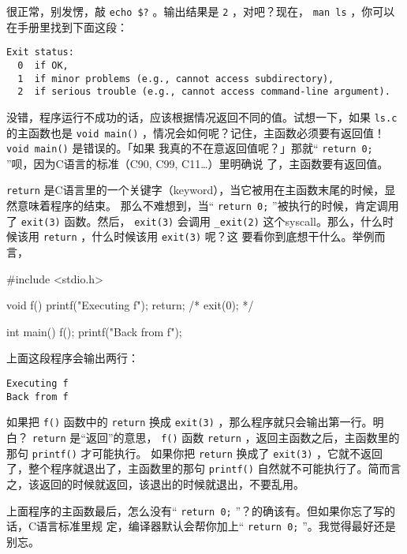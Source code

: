 \documentclass{wx672ctexart}
\begin{document}
很正常，别发愣，敲 \texttt{echo \$?} 。输出结果是 \texttt{2} ，对吧？现在， \texttt{man ls} ，你可以在手册里找到下面这段：
\begin{verbatim}
Exit status:
  0  if OK,
  1  if minor problems (e.g., cannot access subdirectory),
  2  if serious trouble (e.g., cannot access command-line argument).
\end{verbatim}
没错，程序运行不成功的话，应该根据情况返回不同的值。试想一下，如果 \texttt{ls.c} 的主函数也是
\texttt{void main()} ，情况会如何呢？记住，主函数必须要有返回值！ \texttt{void main()} 是错误的。「如果
我真的不在意返回值呢？」那就“ \texttt{return 0;} ”呗，因为C语言的标准（C90, C99, C11\ldots{}）里明确说
了，主函数要有返回值。 

\texttt{return} 是C语言里的一个关键字（keyword），当它被用在主函数末尾的时候，显然意味着程序的结束。
那么不难想到，当“ \texttt{return 0;} ”被执行的时候，肯定调用了 \texttt{exit(3)} 函数。然后， \texttt{exit(3)}
会调用 \texttt{\_exit(2)} 这个syscall。那么，什么时候该用 \texttt{return} ，什么时候该用 \texttt{exit(3)} 呢？这
要看你到底想干什么。举例而言，
\begin{ccode}
#include <stdio.h>

void f(){
	printf("Executing f\n");
	return;
	/* exit(0); */
}

int main(){
	f();
	printf("Back from f\n");
}
\end{ccode}
上面这段程序会输出两行：
\begin{verbatim}
Executing f
Back from f
\end{verbatim}
如果把 \texttt{f()} 函数中的 \texttt{return} 换成 \texttt{exit(3)} ，那么程序就只会输出第一行。明白？ \texttt{return}
是“返回”的意思， \texttt{f()} 函数 \texttt{return} ，返回主函数之后，主函数里的那句 \texttt{printf()} 才可能执行。
如果你把 \texttt{return} 换成了 \texttt{exit(3)} ，它就不返回了，整个程序就退出了，主函数里的那句
\texttt{printf()} 自然就不可能执行了。简而言之，该返回的时候就返回，该退出的时候就退出，不要乱用。

上面程序的主函数最后，怎么没有“ \texttt{return 0;} ”？的确该有。但如果你忘了写的话，C语言标准里规
定，编译器默认会帮你加上“ \texttt{return 0;} ”。我觉得最好还是别忘。
\end{document}
